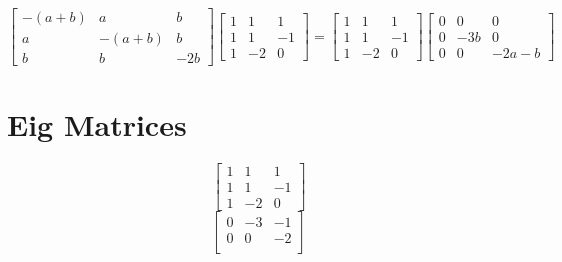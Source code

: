 \documentclass{article}
\begin{document}
\[
	\left[ \begin{matrix}
		-(a+b) & a  & b\\
		a  & -(a+b) & b\\
		b  & b  & -2b
	\end{matrix} \right]
	\left[ \begin{matrix}
		1 &  1 &  1\\
		1 &  1 & -1\\
		1 & -2 &  0
	\end{matrix} \right]
	=
	\left[ \begin{matrix}
		1 &  1 &  1\\
		1 &  1 & -1\\
		1 & -2 &  0
	\end{matrix} \right]
	\left[ \begin{matrix}
		0 & 0  & 0\\
		0  & -3b & 0\\
		0  & 0  & -2a-b
	\end{matrix} \right]
\]

\section{Eig Matrices}

\[ \left[ \begin{matrix}
	1 &  1 &  1\\
	1 &  1 & -1\\
	1 & -2 &  0
\end{matrix} \right] \]
\[ \left[ \begin{matrix}
	0 & -3 & -1\\
	0 &  0 & -2\\
\end{matrix} \right] \]
\end{document}
